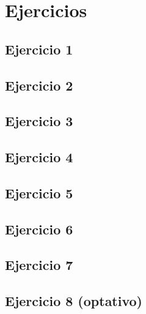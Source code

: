 \documentclass[12pt, a4paper, twoside]{article}
\begin{document}
\newpage{\pagestyle{empty}\cleardoublepage}

\newpage{\pagestyle{empty}\tableofcontents\cleardoublepage}

\clearpage
\setcounter{page}{1}
\section*{Ejercicios}\label{sec:ejercicios}
  \subsection{Ejercicio 1}\label{subsec:ej1}
  
  \clearpage

  \subsection{Ejercicio 2}\label{subsec:ej2}
  
  \clearpage

  \subsection{Ejercicio 3}\label{subsec:ej3}
  
  \clearpage

  \subsection{Ejercicio 4}\label{subsec:ej4}
  
  \clearpage

  \subsection{Ejercicio 5}\label{subsec:ej5}
  
  \clearpage

  \subsection{Ejercicio 6}\label{subsec:ej6}
  
  \clearpage

  \subsection{Ejercicio 7}\label{subsec:ej7}
  
  \clearpage

  \subsection{Ejercicio 8 (optativo)}\label{subsec:ej8}
  
  \clearpage
\end{document}
